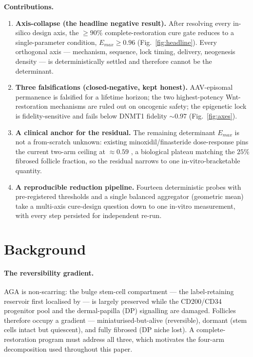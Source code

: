 \documentclass[11pt,a4paper]{article}
\begin{document}
\medskip
\noindent\textbf{Contributions.}
\begin{enumerate}\itemsep0.3em
\item \textbf{Axis-collapse (the headline negative result).} After resolving every
in-silico design axis, the $\geq 90\%$ complete-restoration cure gate reduces to a
single-parameter condition, $E_{max}\geq 0.96$ (Fig.~\ref{fig:headline}). Every
orthogonal axis --- mechanism, sequence, lock timing, delivery, neogenesis density
--- is deterministically settled and therefore cannot be the determinant.
\item \textbf{Three falsifications (closed-negative, kept honest).} AAV-episomal
permanence is falsified for a lifetime horizon; the two highest-potency
Wnt-restoration mechanisms are ruled out on oncogenic safety; the epigenetic lock
is fidelity-sensitive and fails below DNMT1 fidelity ${\sim}0.97$
(Fig.~\ref{fig:axes}).
\item \textbf{A clinical anchor for the residual.} The remaining determinant
$E_{max}$ is not a from-scratch unknown: existing minoxidil/finasteride
dose-response pins the current two-arm ceiling at $\approx 0.59$
\citep{vanneste2020}, a biological plateau matching the $25\%$ fibrosed follicle
fraction, so the residual narrows to one in-vitro-bracketable quantity.
\item \textbf{A reproducible reduction pipeline.} Fourteen deterministic probes
with pre-registered thresholds and a single balanced aggregator (geometric mean)
take a multi-axis cure-design question down to one in-vitro measurement, with every
step persisted for independent re-run.
\end{enumerate}

\section{Background}
\label{sec:bg}

\paragraph{The reversibility gradient.} AGA is non-scarring: the bulge stem-cell
compartment --- the label-retaining reservoir first localised by
\citet{cotsarelis1990} --- is largely preserved while the CD200/CD34 progenitor
pool and the dermal-papilla (DP) signalling are damaged. Follicles therefore occupy a gradient
--- miniaturised-but-alive (reversible), dormant (stem cells intact but quiescent),
and fully fibrosed (DP niche lost). A complete-restoration program must address all
three, which motivates the four-arm decomposition used throughout this paper.
\end{document}

